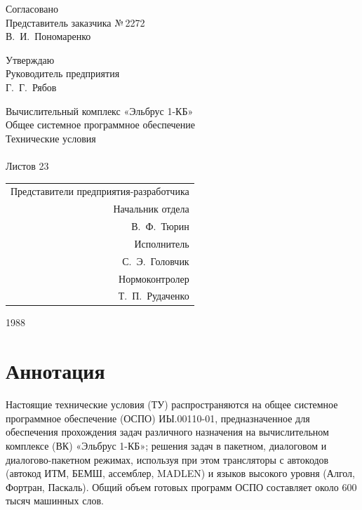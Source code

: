 \documentclass[11pt,a4paper]{article}
\begin{document}
\begin{titlepage}\small
\noindent\begin{minipage}[t]{0.45\linewidth}Согласовано\\Представитель заказчика №\,2272\\В.~И.~Пономаренко\end{minipage}\hfill\begin{minipage}[t]{0.45\linewidth}\raggedleft Утверждаю\\Руководитель предприятия\\Г.~Г.~Рябов\end{minipage}
\vspace*{\fill}\begin{center}
{\large Вычислительный комплекс «Эльбрус 1-КБ»}\\[0.6em]
{\large Общее системное программное обеспечение}\\[0.6em]
{\large Технические условия}\\[0.6em]
\vspace{1em}{\large\bfseries ИЫ.00110-01 28 01}\\[0.4em]
Листов 23\end{center}\vspace*{\fill}
\begin{flushright}\begin{tabular}{r}Представители предприятия-разработчика\\Начальник отдела\\В.~Ф.~Тюрин\\Исполнитель\\С.~Э.~Головчик\\Нормоконтролер\\Т.~П.~Рудаченко\end{tabular}\end{flushright}
\begin{center}1988\end{center}\end{titlepage}
\section*{Аннотация}
Настоящие технические условия (ТУ) распространяются на общее системное программное обеспечение (ОСПО) ИЫ.00110-01, предназначенное для обеспечения прохождения задач различного назначения на вычислительном комплексе (ВК) «Эльбрус 1-КБ»; решения задач в пакетном, диалоговом и диалогово-пакетном режимах, используя при этом трансляторы с автокодов (автокод ИТМ, БЕМШ, ассемблер, MADLEN) и языков высокого уровня (Алгол, Фортран, Паскаль). Общий объем готовых программ ОСПО составляет около 600 тысяч машинных слов.
\end{document}
